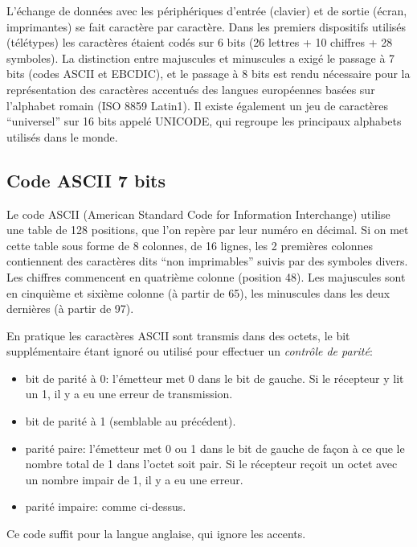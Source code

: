 L'\'echange de donn\'ees avec les p\'eriph\'eriques d'entr\'ee
(clavier) et de sortie (\'ecran, imprimantes) se fait caract\`ere par
caract\`ere. Dans les premiers dispositifs utilis\'es (télétypes)
les caract\`eres \'etaient cod\'es sur 6 bits (26 lettres + 10
chiffres + 28 symboles). La distinction entre majuscules et minuscules
a exig\'e le passage \`a 7 bits (codes ASCII et EBCDIC), et le passage
\`a 8 bits est rendu n\'ecessaire pour la repr\'esentation des
caract\`eres accentu\'es des langues europ\'eennes bas\'ees sur
l'alphabet romain (ISO 8859 Latin1).  Il existe également un jeu de
caract\`eres ``universel'' sur 16 bits appelé UNICODE, qui regroupe les
principaux alphabets utilisés dans le monde.

\subsection{Code ASCII 7 bits}

Le code ASCII (American Standard Code for Information Interchange)
 utilise une table de 128 positions, que l'on rep\`ere par leur num\'ero en 
d\'ecimal. Si on met cette table sous forme de 8 colonnes, de 16 lignes,
les 2 premi\`eres colonnes contiennent des caract\`eres 
dits ``non imprimables'' suivis par des symboles divers.
Les chiffres commencent en quatri\`eme colonne (position 48). Les majuscules
sont en cinqui\`eme et sixi\`eme colonne (\`a partir de 65), les minuscules dans les
deux derni\`eres (\`a partir de 97).

En pratique les caract\`eres ASCII sont transmis dans des octets, le bit 
suppl\'ementaire \'etant ignor\'e ou utilis\'e pour effectuer un {\em contr\^ole de
parit\'e}:
\begin{itemize}
\item bit de parit\'e \`a 0: l'\'emetteur met 0 dans le bit de gauche. Si le 
r\'ecepteur y lit un 1, il y a eu une erreur de transmission.
\item bit de parit\'e \`a 1 (semblable au pr\'ec\'edent).
\item parit\'e paire: l'\'emetteur met 0 ou 1 dans le bit de gauche de fa\c{c}on
\`a ce que le nombre total de 1 dans l'octet soit pair. Si le r\'ecepteur re\c{c}oit
un octet avec un nombre impair de 1, il y a eu une erreur. 
\item parit\'e impaire: comme ci-dessus.
\end{itemize}

Ce code suffit pour la langue anglaise, qui ignore les accents. 


